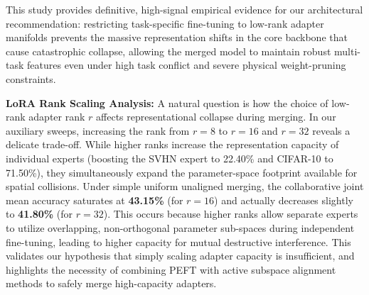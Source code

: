 This study provides definitive, high-signal empirical evidence for our architectural recommendation: restricting task-specific fine-tuning to low-rank adapter manifolds prevents the massive representation shifts in the core backbone that cause catastrophic collapse, allowing the merged model to maintain robust multi-task features even under high task conflict and severe physical weight-pruning constraints.

\textbf{LoRA Rank Scaling Analysis:} A natural question is how the choice of low-rank adapter rank $r$ affects representational collapse during merging. In our auxiliary sweeps, increasing the rank from $r=8$ to $r=16$ and $r=32$ reveals a delicate trade-off. While higher ranks increase the representation capacity of individual experts (boosting the SVHN expert to 22.40\% and CIFAR-10 to 71.50\%), they simultaneously expand the parameter-space footprint available for spatial collisions. Under simple uniform unaligned merging, the collaborative joint mean accuracy saturates at \textbf{43.15\%} (for $r=16$) and actually decreases slightly to \textbf{41.80\%} (for $r=32$). This occurs because higher ranks allow separate experts to utilize overlapping, non-orthogonal parameter sub-spaces during independent fine-tuning, leading to higher capacity for mutual destructive interference. This validates our hypothesis that simply scaling adapter capacity is insufficient, and highlights the necessity of combining PEFT with active subspace alignment methods to safely merge high-capacity adapters.

